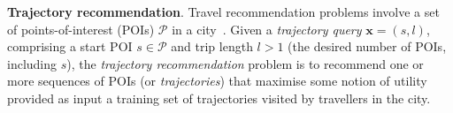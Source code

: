 


\textbf{Trajectory recommendation}.
Travel recommendation problems involve a set of points-of-interest (POIs) $\mathcal{P}$ in a city~\cite{bao2015recommendations,zheng2015trajectory,zheng2014urban}.
Given a \emph{trajectory query} $\mathbf{x} = (s, l)$,
comprising a start POI $s \in \mathcal{P}$ and trip length
$l \!>\! 1$ (\ie the desired number of POIs, including $s$),
the \emph{trajectory recommendation} problem is to
recommend one or more sequences of POIs (or \emph{trajectories}) %
that maximise some notion of utility
provided as input a training set
of trajectories visited by travellers in the city.

